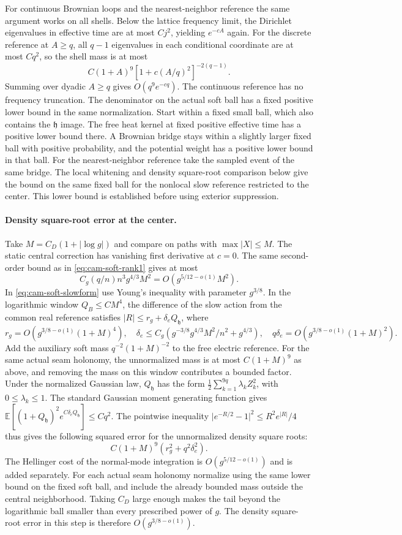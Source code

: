 \documentclass[11pt,a4paper]{article}
\numberwithin{equation}{section}
\newcommand{\hper}{\mathfrak h}
\begin{document}
For continuous Brownian loops and the nearest-neighbor reference the same argument works on all shells. Below the lattice frequency limit, the Dirichlet eigenvalues in effective time are at most \(Cj^2\), yielding \(e^{-cA}\) again. For the discrete reference at \(A\ge q\), all \(q-1\) eigenvalues in each conditional coordinate are at most \(Cq^2\), so the shell mass is at most
\[
 C(1+A)^9[1+c(A/q)^2]^{-2(q-1)} .
\]
Summing over dyadic \(A\ge q\) gives \(O(q^9e^{-c q})\). The continuous reference has no frequency truncation. The denominator on the actual soft ball has a fixed positive lower bound in the same normalization. Start within a fixed small ball, which also contains the \(\hper\) image. The free heat kernel at fixed positive effective time has a positive lower bound there. A Brownian bridge stays within a slightly larger fixed ball with positive probability, and the potential weight has a positive lower bound in that ball. For the nearest-neighbor reference take the sampled event of the same bridge. The local whitening and density square-root comparison below give the bound on the same fixed ball for the nonlocal slow reference restricted to the center. This lower bound is established before using exterior suppression.

\paragraph{Density square-root error at the center.}
Take \(M=C_D(1+|\log g|)\) and compare on paths with \(\max|X|\le M\). The static central correction has vanishing first derivative at \(c=0\). The same second-order bound as in \eqref{eq:cam-soft-rank1} gives at most
\[
     C_g(q/n)n^3 g^{4/3}M^2=O(g^{5/12-o(1)}M^2).
\]
In \eqref{eq:cam-soft-slowform} use Young's inequality with parameter \(g^{3/8}\). In the logarithmic window \(Q_B\le CM^4\), the difference of the slow action from the common real reference satisfies
\(\lvert R\rvert\le r_g+\delta_e Q_\hper \), where
\[
 r_g=O(g^{3/8-o(1)}(1+M)^4),\quad
 \delta_e\le C_g(g^{-3/8}g^{4/3}M^2/n^2+g^{4/3}),\quad
 q\delta_e=O(g^{3/8-o(1)}(1+M)^2).
\]
Add the auxiliary soft mass \(q^{-2}(1+M)^{-2}\) to the free electric reference. For the same actual seam holonomy, the unnormalized mass is at most \(C(1+M)^9\) as above, and removing the mass on this window contributes a bounded factor. Under the normalized Gaussian law, \(Q_\hper \) has the form
\(\frac12\sum_{k=1}^{9q}\lambda_kZ_k^2\), with \(0\le\lambda_k\le1\). The standard Gaussian moment generating function gives
\(\mathbb E[(1+Q_\hper )^2e^{C\delta_e Q_\hper }]\le Cq^2\).
The pointwise inequality
\(\lvert e^{-R/2}-1\rvert^2\le R^2e^{|R|}/4\) thus gives the following squared error for the unnormalized density square roots:
\[
 C(1+M)^9(r_g^2+q^2\delta_e^2).
\]
The Hellinger cost of the normal-mode integration is \(O(g^{5/12-o(1)})\) and is added separately. For each actual seam holonomy normalize using the same lower bound on the fixed soft ball, and include the already bounded mass outside the central neighborhood. Taking \(C_D\) large enough makes the tail beyond the logarithmic ball smaller than every prescribed power of \(g\). The density square-root error in this step is therefore \(O(g^{3/8-o(1)})\).
\end{document}
